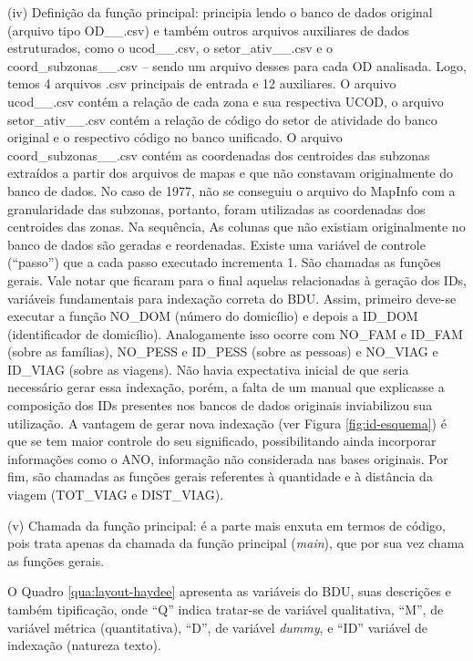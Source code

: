 \begin{compactitem}[]
\item (iv) Definição da função principal: principia lendo o banco de dados original (arquivo tipo OD__.csv) e também outros arquivos auxiliares de dados estruturados, como o ucod__.csv, o setor_ativ__.csv e o coord_subzonas__.csv – sendo um arquivo desses para cada OD analisada. Logo, temos 4 arquivos .csv principais de entrada e 12 auxiliares. O arquivo ucod__.csv contém a relação de cada zona e sua respectiva UCOD, o arquivo setor_ativ__.csv contém a relação de código do setor de atividade do banco original e o respectivo código no banco unificado. O arquivo coord_subzonas__.csv contém as coordenadas dos centroides das subzonas extraídos a partir dos arquivos de mapas e que não constavam originalmente do banco de dados. No caso de 1977, não se conseguiu o arquivo do MapInfo com a granularidade das subzonas, portanto, foram utilizadas as coordenadas dos centroides das zonas. Na sequência, As colunas que não existiam originalmente no banco de dados são geradas e reordenadas. Existe uma variável de controle (``passo'') que a cada passo executado incrementa 1. São chamadas as funções gerais. Vale notar que ficaram para o final aquelas relacionadas à geração dos IDs, variáveis fundamentais para indexação correta do BDU. Assim, primeiro deve-se executar a função NO_DOM (número do domicílio) e depois a ID_DOM (identificador de domicílio). Analogamente isso ocorre com NO_FAM e ID_FAM (sobre as famílias), NO_PESS e ID_PESS (sobre as pessoas) e NO_VIAG e ID_VIAG (sobre as viagens). Não havia expectativa inicial de que seria necessário gerar essa indexação, porém, a falta de um manual que explicasse a composição dos IDs presentes nos bancos de dados originais inviabilizou sua utilização. A vantagem de gerar nova indexação (ver Figura \ref{fig:id-esquema}) é que se tem maior controle do seu significado, possibilitando ainda incorporar informações como o ANO, informação não considerada nas bases originais. Por fim, são chamadas as funções gerais referentes à quantidade e à distância da viagem (TOT_VIAG e DIST_VIAG).\\

\item (v) Chamada da função principal: é a parte mais enxuta em termos de código, pois trata apenas da chamada da função principal (\textit{main}), que por sua vez chama as funções gerais.

\end{compactitem} 

O Quadro \ref{qua:layout-haydee} apresenta as variáveis do BDU, suas descrições e também tipificação, onde ``Q'' indica tratar-se de variável qualitativa, ``M'', de variável métrica (quantitativa), ``D'', de variável \textit{dummy}, e ``ID'' variável de indexação (natureza texto).

